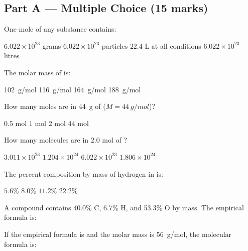 \documentclass[addpoints]{exam}
\begin{document}
\newpage
\begin{questions}

\section*{Part A --- Multiple Choice (15 marks)}
\vspace{5mm}

\question[1] One mole of any substance contains:
\begin{choices}
    \choice $6.022 \times 10^{23}$ grams
    \correctchoice $6.022 \times 10^{23}$ particles
    \choice $22.4$ L at all conditions
    \choice $6.022 \times 10^{23}$ litres
\end{choices}

\question[1] The molar mass of  is:
\begin{choices}
    \choice \SI{102}{g/mol}
    \choice \SI{116}{g/mol}
    \correctchoice \SI{164}{g/mol}
    \choice \SI{188}{g/mol}
\end{choices}

\question[1] How many moles are in \SI{44}{g} of  ($M = \SI{44}{g/mol}$)?
\begin{choices}
    \choice $0.5$ mol
    \correctchoice $1$ mol
    \choice $2$ mol
    \choice $44$ mol
\end{choices}

\question[1] How many molecules are in $2.0$ mol of ?
\begin{choices}
    \choice $3.011 \times 10^{23}$
    \correctchoice $1.204 \times 10^{24}$
    \choice $6.022 \times 10^{23}$
    \choice $1.806 \times 10^{24}$
\end{choices}

\question[1] The percent composition by mass of hydrogen in  is:
\begin{choices}
    \choice $5.6\%$
    \choice $8.0\%$
    \correctchoice $11.2\%$
    \choice $22.2\%$
\end{choices}

\question[1] A compound contains 40.0\% C, 6.7\% H, and 53.3\% O by mass.
The empirical formula is:
\begin{choices}
    \choice {}
    \correctchoice {}
    \choice {}
    \choice {}
\end{choices}

\question[1] If the empirical formula is  and the molar mass is \SI{56}{g/mol},
the molecular formula is:
\begin{choices}
    \choice {}
    \choice {}
    \correctchoice {}
    \choice {}
\end{choices}


\end{questions}
\end{document}
